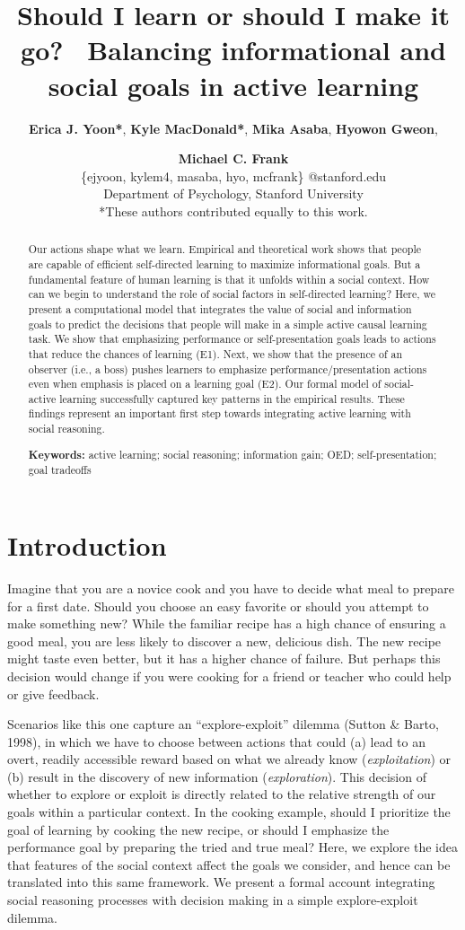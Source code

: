 \documentclass[10pt, letterpaper]{article}
\title{Should I learn or should I make it go? ~Balancing informational and
social goals in active learning}
\author{{\large \bf Erica J. Yoon*}, {\large \bf Kyle MacDonald*}, {\large \bf Mika Asaba}, {\large \bf Hyowon Gweon}, \and {\large \bf Michael C. Frank} \\ \{ejyoon, kylem4, masaba, hyo, mcfrank\} @stanford.edu \\ Department of Psychology, Stanford University \\ *These authors contributed equally to this work.}
\begin{document}
\maketitle

\begin{abstract}
Our actions shape what we learn. Empirical and theoretical work shows
that people are capable of efficient self-directed learning to maximize
informational goals. But a fundamental feature of human learning is that
it unfolds within a social context. How can we begin to understand the
role of social factors in self-directed learning? Here, we present a
computational model that integrates the value of social and information
goals to predict the decisions that people will make in a simple active
causal learning task. We show that emphasizing performance or
self-presentation goals leads to actions that reduce the chances of
learning (E1). Next, we show that the presence of an observer (i.e., a
boss) pushes learners to emphasize performance/presentation actions even
when emphasis is placed on a learning goal (E2). Our formal model of
social-active learning successfully captured key patterns in the
empirical results. These findings represent an important first step
towards integrating active learning with social reasoning.

\textbf{Keywords:}
active learning; social reasoning; information gain; OED;
self-presentation; goal tradeoffs
\end{abstract}

\section{Introduction}\label{introduction}

Imagine that you are a novice cook and you have to decide what meal to
prepare for a first date. Should you choose an easy favorite or should
you attempt to make something new? While the familiar recipe has a high
chance of ensuring a good meal, you are less likely to discover a new,
delicious dish. The new recipe might taste even better, but it has a
higher chance of failure. But perhaps this decision would change if you
were cooking for a friend or teacher who could help or give feedback.

Scenarios like this one capture an ``explore-exploit'' dilemma (Sutton
\& Barto, 1998), in which we have to choose between actions that could
(a) lead to an overt, readily accessible reward based on what we already
know (\emph{exploitation}) or (b) result in the discovery of new
information (\emph{exploration}). This decision of whether to explore or
exploit is directly related to the relative strength of our goals within
a particular context. In the cooking example, should I prioritize the
goal of learning by cooking the new recipe, or should I emphasize the
performance goal by preparing the tried and true meal? Here, we explore
the idea that features of the social context affect the goals we
consider, and hence can be translated into this same framework. We
present a formal account integrating social reasoning processes with
decision making in a simple explore-exploit dilemma.
\end{document}
